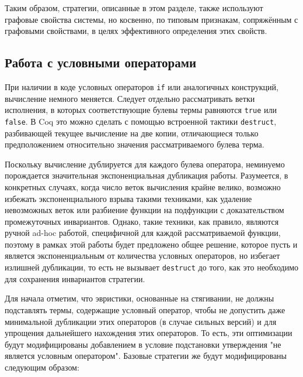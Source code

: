 \documentclass[../thesis.tex]{subfiles}
\begin{document}
Таким образом, стратегии, описанные в этом разделе, также используют графовые свойства системы, но косвенно, по типовым признакам, сопряжённым с графовыми свойствами, в целях эффективного определения этих свойств. 

\subsection{Работа с условными операторами}\label{ifs}

При наличии в коде условных операторов \texttt{if} или аналогичных конструкций, вычисление немного меняется. Следует отдельно рассматривать ветки исполнения, в которых соответствующие булевы термы равняются \texttt{true} или \texttt{false}. В Coq это можно сделать с помощью встроенной тактики \texttt{destruct}, разбивающей текущее вычисление на две копии, отличающиеся только предположением относительно значения рассматриваемого булева терма.

Поскольку вычисление дублируется для каждого булева оператора, неминуемо порождается значительная экспоненциальная дубликация работы. Разумеется, в конкретных случаях, когда число веток вычисления крайне велико, возможно избежать экспоненциального взрыва такими техниками, как удаление невозможных веток или разбиение функции на подфункции с доказательством промежуточных инвариантов. Однако, такие техники, как правило, являются ручной ad-hoc работой, специфичной для каждой рассматриваемой функции, поэтому в рамках этой работы будет предложено общее решение, которое пусть и является экспоненциальным от количества условных операторов, но избегает излишней дубликации, то есть не вызывает \texttt{destruct} до того, как это необходимо для сохранения инвариантов стратегии.

Для начала отметим, что эвристики, основанные на стягивании, не должны подставлять термы, содержащие условный оператор, чтобы не допустить даже минимальной дубликации этих операторов (в случае сильных версий) и для упрощения дальнейшего нахождения этих операторов. То есть, эти оптимизации будут модифицированы добавлением в условие подстановки утверждения "не является условным оператором". Базовые стратегии же будут модифицированы следующим образом:
\end{document}
